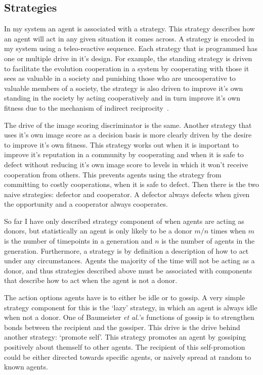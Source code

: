 \documentclass[]{final_report}
\begin{document}
\subsection{Strategies}
\label{subs:strat}
In my system an agent is associated with a strategy. This strategy describes how an agent will act in any given situation it comes across. A strategy is encoded in my system using a teleo-reactive sequence. Each strategy that is programmed has one or multiple drive in it's design. For example, the standing strategy is driven to facilitate the evolution cooperation in a system by cooperating with those it sees as valuable in a society and punishing those who are uncooperative to valuable members of a society, the strategy is also driven to improve it's own standing in the society by acting cooperatively and in turn improve it's own fitness due to the mechanism of indirect reciprocity~\cite{imagevsstanding}.\par
The drive of the image scoring discriminator is the same. Another strategy that uses it's own image score as a decision basis is more clearly driven by the desire to improve it's own fitness. This strategy works out when it is important to improve it's reputation in a community by cooperating and when it is safe to defect without reducing it's own image score to levels in which it won't receive cooperation from others. This prevents agents using the strategy from committing to costly cooperations, when it is safe to defect. Then there is the two naive strategies: defector and cooperator. A defector always defects when given the opportunity and a cooperator always cooperates.\par
So far I have only described strategy component of when agents are acting as donors, but statistically an agent is only likely to be a donor $m/n$ times when $m$ is the number of timepoints in a generation and $n$ is the number of agents in the generation. Furthermore, a strategy is by definition a description of how to act under any circumstances. Agents the majority of the time will not be acting as a donor, and thus strategies described above must be associated with components that describe how to act when the agent is not a donor.\par
The action options agents have is to either be idle or to gossip. A very simple strategy component for this is the `lazy' strategy, in which an agent is always idle when not a donor. One of Baumeister \textit{et al.}'s functions of gossip is to strengthen bonds between the recipient and the gossiper. This drive is the drive behind another strategy: `promote self'. This strategy promotes an agent by gossiping positively about themself to other agents. The recipient of this self-promotion could be either directed towards specific agents, or naively spread at random to known agents.\par
\end{document}
